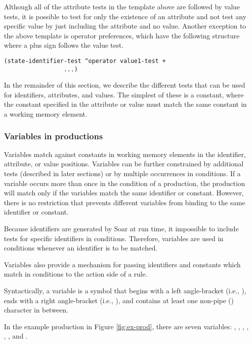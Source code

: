 Although all of the attribute tests in the template above are followed
by value tests, it is possible to test for only the existence of an
attribute and not test any specific value by just including the
attribute and no value.  Another exception to the above template is
operator preferences, which have the following structure where a plus
sign follows the value test.
\begin{verbatim}
(state-identifier-test ^operator value1-test +
                 ...)
\end{verbatim}

In the remainder of this section, we describe the different tests that
can be used for identifiers, attributes, and values.  The simplest of
these is a constant, where the constant specified in the attribute or
value must match the same constant in a working memory element.

\subsubsection{Variables in productions}
\label{SYNTAX-pm-variables}

Variables match against constants in working memory elements in the
identifier, attribute, or value positions.  Variables can be further
constrained by additional tests (described in later sections) or by
multiple occurrences in conditions.  If a variable occurs more than once
in the condition of a production, the production will match only if the
variables match the same identifier or constant.  However, there is no
restriction that prevents different variables from binding to the same
identifier or constant.

Because identifiers are generated by Soar at run time, it impossible to
include tests for specific identifiers in conditions.  Therefore,
variables are used in conditions whenever an identifier is to be
matched.

Variables also provide a mechanism for passing identifiers and constants
which match in conditions to the action side of a rule.

Syntactically, a variable is a symbol that begins with
a left angle-bracket (i.e., \soar{<}), ends with a right angle-bracket (i.e.,
\soar{>}), and contains at least one non-pipe (\soar{|}) character in between.

In the example production in Figure \ref{fig:ex-prod}, there are seven
variables: , , , ,
, , and .

